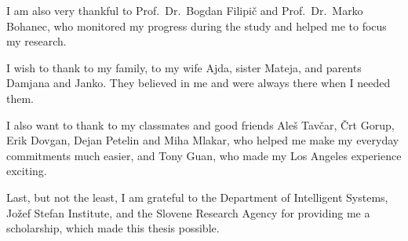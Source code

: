 I am also very thankful to Prof.\ Dr.\ Bogdan Filipi\v{c} and Prof.\ Dr.\ Marko Bohanec, who monitored my progress during the study and helped me to focus my research.




I wish to thank to my family, to my wife Ajda, sister Mateja, and parents Damjana and Janko. They believed in me and were always there when I needed them.

I also want to thank to my classmates and good friends Ale\v{s} Tav{\v c}ar, {\v C}rt Gorup, Erik Dovgan, Dejan Petelin and Miha Mlakar, who helped me make my everyday commitments much easier, and Tony Guan, who made my Los Angeles experience exciting.

Last, but not the least, I am grateful to the Department of Intelligent Systems, Jo\v{z}ef Stefan Institute, and the Slovene Research Agency for providing me a scholarship, which made this thesis possible.
